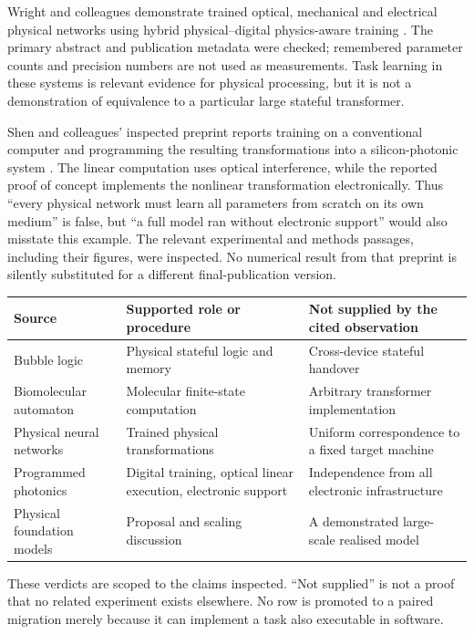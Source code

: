 Wright and colleagues demonstrate trained optical, mechanical and electrical physical networks using hybrid physical--digital physics-aware training \citep{wright}. The primary abstract and publication metadata were checked; remembered parameter counts and precision numbers are not used as measurements. Task learning in these systems is relevant evidence for physical processing, but it is not a demonstration of equivalence to a particular large stateful transformer.

Shen and colleagues' inspected preprint reports training on a conventional computer and programming the resulting transformations into a silicon-photonic system \citep{shen}. The linear computation uses optical interference, while the reported proof of concept implements the nonlinear transformation electronically. Thus ``every physical network must learn all parameters from scratch on its own medium'' is false, but ``a full model ran without electronic support'' would also misstate this example. The relevant experimental and methods passages, including their figures, were inspected. No numerical result from that preprint is silently substituted for a different final-publication version.

\begin{center}\small
\begin{tabular}{@{}>{\raggedright\arraybackslash}p{}>{\raggedright\arraybackslash}p{}>{\raggedright\arraybackslash}p{}@{}}\toprule
Source & Supported role or procedure & Not supplied by the cited observation\\\midrule
Bubble logic \citep{bubble} & Physical stateful logic and memory & Cross-device stateful handover\\
Biomolecular automaton \citep{benenson} & Molecular finite-state computation & Arbitrary transformer implementation\\
Physical neural networks \citep{wright} & Trained physical transformations & Uniform correspondence to a fixed target machine\\
Programmed photonics \citep{shen} & Digital training, optical linear execution, electronic support & Independence from all electronic infrastructure\\
Physical foundation models \citep{pfm} & Proposal and scaling discussion & A demonstrated large-scale realised model\\\bottomrule
\end{tabular}
\end{center}
These verdicts are scoped to the claims inspected. ``Not supplied'' is not a proof that no related experiment exists elsewhere. No row is promoted to a paired migration merely because it can implement a task also executable in software.

